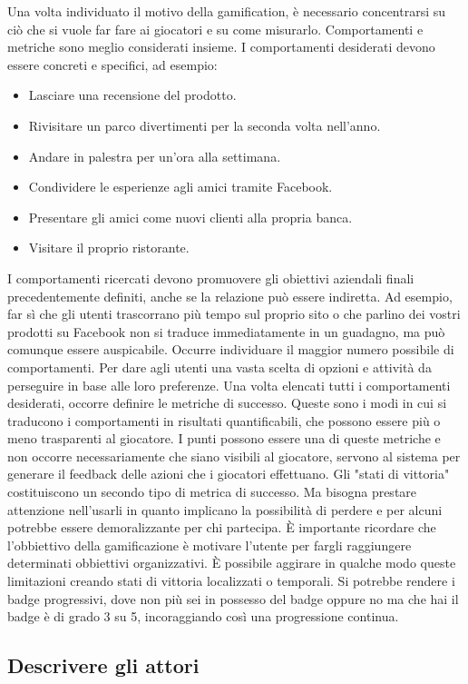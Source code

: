 \begin{itemize}
Una volta individuato il motivo della gamification, è necessario concentrarsi su ciò che si vuole far fare ai giocatori e su come misurarlo. Comportamenti e metriche sono meglio considerati insieme. I comportamenti desiderati devono essere concreti e specifici, ad esempio:
\begin{itemize}
\item Lasciare una recensione del prodotto.
\item Rivisitare un parco divertimenti per la seconda volta nell'anno.
\item Andare in palestra per un'ora alla settimana.
\item Condividere le esperienze agli amici tramite Facebook.
\item Presentare gli amici come nuovi clienti alla propria banca.
\item Visitare il proprio ristorante.
\end{itemize}
I comportamenti ricercati devono promuovere gli obiettivi aziendali finali precedentemente definiti, anche se la relazione può essere indiretta. Ad esempio, far sì che gli utenti trascorrano più tempo sul proprio sito o che parlino dei vostri prodotti su Facebook non si traduce immediatamente in un guadagno, ma può comunque essere auspicabile. Occurre individuare il maggior numero possibile di comportamenti. Per dare agli utenti una vasta scelta di opzioni e attività da perseguire in base alle loro preferenze.
Una volta elencati tutti i comportamenti desiderati, occorre definire le metriche di successo. Queste sono i modi in cui si traducono i comportamenti in risultati quantificabili, che possono essere più o meno trasparenti al giocatore. I punti possono essere una di queste metriche e non occorre necessariamente che siano visibili al giocatore, servono al sistema per generare il feedback delle azioni che i giocatori effettuano.
Gli "stati di vittoria" costituiscono un secondo tipo di metrica di successo. Ma bisogna prestare attenzione nell'usarli in quanto implicano la possibilità di perdere e per alcuni potrebbe essere demoralizzante per chi partecipa. È importante ricordare che l'obbiettivo della gamificazione è motivare l'utente per fargli raggiungere determinati obbiettivi organizzativi. È possibile aggirare in qualche modo queste limitazioni creando stati di vittoria localizzati o temporali.
Si potrebbe rendere i badge progressivi, dove non più sei in possesso del badge oppure no ma che hai il badge è di grado 3 su 5, incoraggiando così una progressione continua.

\subsection{Descrivere gli attori}


\end{itemize}
